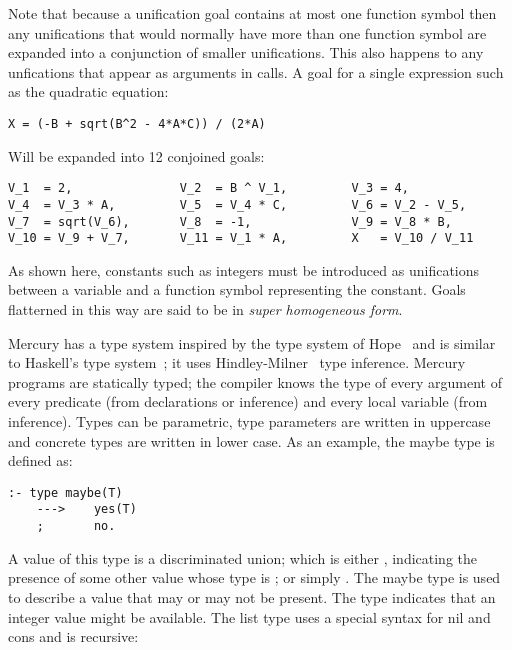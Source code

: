 \label{superhomogeneous}
Note that because a unification goal contains at most one function symbol
then any unifications that would normally have more than one function symbol
are expanded into a conjunction of smaller unifications.
This also happens to any unfications that appear as arguments in calls.
A goal for a single expression such as the quadratic equation:

\begin{verbatim}
X = (-B + sqrt(B^2 - 4*A*C)) / (2*A)
\end{verbatim}

\noindent
Will be expanded into 12 conjoined goals:

\begin{verbatim}
V_1  = 2,               V_2  = B ^ V_1,         V_3 = 4,
V_4  = V_3 * A,         V_5  = V_4 * C,         V_6 = V_2 - V_5,
V_7  = sqrt(V_6),       V_8  = -1,              V_9 = V_8 * B,
V_10 = V_9 + V_7,       V_11 = V_1 * A,         X   = V_10 / V_11
\end{verbatim}

\noindent
As shown here,
constants such as integers must be introduced as unifications between a
variable and a function symbol representing the constant.
Goals flatterned in this way are said to be in
\emph{super homogeneous form}.

Mercury has a type system inspired by the type system of Hope~\citep{hope}
and is similar to Haskell's type system~\citep{haskell98};
it uses Hindley-Milner~\citep{hindley69:types,milner78:types} type
inference.
Mercury programs are statically typed; the compiler knows the type of every
argument of every predicate (from declarations or inference) and every local
variable (from inference).
Types can be parametric,
type parameters are written in uppercase and
concrete types are written in lower case.
As an example, the maybe type is defined as:

\begin{verbatim}
:- type maybe(T)
    --->    yes(T)
    ;       no.
\end{verbatim}

\noindent
A value of this type is a discriminated union;
which is either , indicating the presence of some other value
whose type is ;
or simply .
The maybe type is used to describe a value that may or may not be present.
The type  indicates that an integer value might be
available.
The list type uses a special syntax for nil and cons and is recursive:

